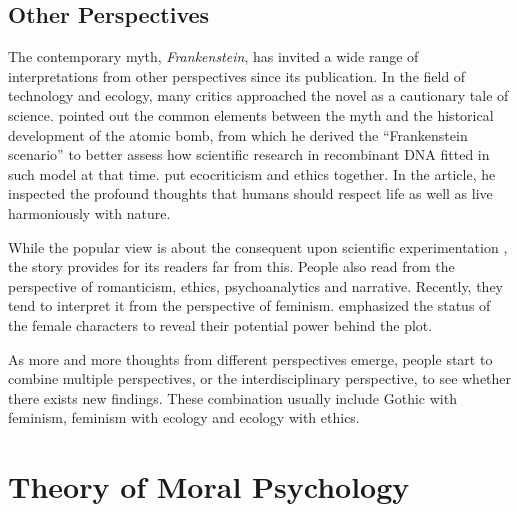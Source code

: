 \subsection{Other Perspectives} %
\label{sub:other_perspectives}
\begin{text}

The contemporary myth, \textit{Frankenstein}, has invited a wide range of interpretations from other perspectives since its publication. In the field of technology and ecology, many critics approached the novel as a cautionary tale of science. \citet{isaacs1986creation} pointed out the common elements between the myth and the historical development of the atomic bomb, from which he derived the ``Frankenstein scenario'' to better assess how scientific research in recombinant DNA fitted in such model at that time.  put ecocriticism and ethics together. In the article, he inspected the profound thoughts that humans should respect life as well as live harmoniously with nature.

While the popular view is about the consequent upon scientific experimentation \citep{davies2004can}, the story provides for its readers far from this. People also read from the perspective of romanticism, ethics, psychoanalytics and narrative. Recently, they tend to interpret it from the perspective of feminism.  emphasized the status of the female characters to reveal their potential power behind the plot.

As more and more thoughts from different perspectives emerge, people start to combine multiple perspectives, or the interdisciplinary perspective, to see whether there exists new findings. These combination usually include Gothic with feminism, feminism with ecology and ecology with ethics.

\end{text}
\section{Theory of Moral Psychology} %
\label{sec:theory_of_moral_psychology}
